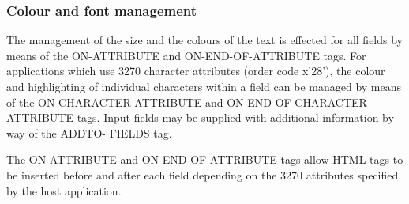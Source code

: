 \documentclass[letterpaper,10pt,english]{sphinxmanual}
\begin{document}
\begin{sphinxVerbatim}[commandchars=\\\{\}]
    
      
\end{sphinxVerbatim}


\subsubsection{Colour and font management}
\label{\detokenize{User_Guide:colour-and-font-management}}

The management of the size and the colours of the text is effected for all fields by means of the ON-ATTRIBUTE and
ON-END-OF-ATTRIBUTE tags. For applications which use 3270 character attributes (order code x’28’), the colour and
highlighting of individual characters within a field can be managed by means of the ON-CHARACTER-ATTRIBUTE and
ON-END-OF-CHARACTER-ATTRIBUTE tags. Input fields may be supplied with additional information by way of the ADDTO-
FIELDS tag.


The ON-ATTRIBUTE and ON-END-OF-ATTRIBUTE tags allow HTML tags to be inserted before and after each field
depending on the 3270 attributes specified by the host application.

\begin{sphinxVerbatim}[commandchars=\\\{\}]
      
\end{sphinxVerbatim}
\end{document}
